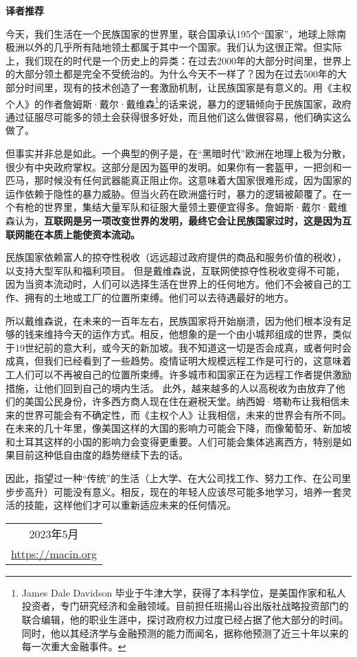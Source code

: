 \begin{center}
    \Huge\textbf{译者推荐}
\end{center}

今天，我们生活在一个民族国家的世界里，联合国承认195个“国家”，地球上除南极洲以外的几乎所有陆地领土都属于其中一个国家。我们认为这很正常。但实际上，我们现在的时代是一个历史上的异类：在过去2000年的大部分时间里，世界上的大部分领土都是完全不受统治的。为什么今天不一样了？因为在过去500年的大部分时间里，现有的技术创造了一套激励机制，让民族国家是有意义的。用《主权个人》的作者詹姆斯·戴尔·戴维森\footnote{James Dale Davidson 毕业于牛津大学，获得了本科学位，是美国作家和私人投资者，专门研究经济和金融领域。目前担任班揚山谷出版社战略投资部门的联合编辑，他的职业生涯中，探讨政府权力过度已经占据了他大部分的时间。同时，他以其经济学与金融预测的能力而闻名，据称他预测了近三十年以来的每一次重大金融事件。}的话来说，暴力的逻辑倾向于民族国家，政府通过征服尽可能多的领土会获得很多好处，而且他们这么做很容易，他们确实这么做了。

但事实并非总是如此。一个典型的例子是，在“黑暗时代”欧洲在地理上极为分散，很少有中央政府掌权。这部分是因为盔甲的发明。如果你有一套盔甲，一把剑和一匹马，那时候没有任何武器能真正阻止你。这意味着大国家很难形成，因为国家的运作依赖于隐性的暴力威胁。但当火药在欧洲盛行时，暴力的逻辑被颠覆了。在一个有枪的世界里，集结大量军队和征服大量领土要便宜得多。詹姆斯·戴尔·戴维森认为，\textbf{互联网是另一项改变世界的发明，最终它会让民族国家过时，这是因为互联网能在本质上能使资本流动。}

民族国家依赖富人的掠夺性税收（远远超过政府提供的商品和服务价值的税收），以支持大型军队和福利项目。 但是戴维森说，互联网使掠夺性税收变得不可能，因为当资本流动时，人们可以选择生活在世界上的任何地方。他们不会被自己的工作、拥有的土地或工厂的位置所束缚。他们可以去待遇最好的地方。

所以戴维森说，在未来的一百年左右，民族国家将开始崩溃，因为他们根本没有足够的钱来维持今天的运作方式。相反，他想象的是一个由小城邦组成的世界，类似于19世纪前的意大利，或今天的新加坡。我不知道这一切是否会成真，或者何时会成真，但我们已经看到了一些趋势。疫情证明大规模远程工作是可行的，这意味着工人们可以不再被自己的位置所束缚。许多城市和国家正在为远程工作者提供激励措施，让他们回到自己的境内生活。 此外，越来越多的人以高税收为由放弃了他们的美国公民身份，许多西方商人现在住在避税天堂。纳西姆·塔勒布让我相信未来的世界可能会有不确定性，而《主权个人》让我相信，未来的世界会有所不同。在未来的几十年里，像美国这样的大国的影响力可能会下降，而像葡萄牙、新加坡和土耳其这样的小国的影响力会变得更重要。人们可能会集体逃离西方，特别是如果目前这种低自由度的趋势继续下去的话。

因此，指望过一种“传统”的生活（上大学、在大公司找工作、努力工作、在公司里步步高升）可能没有意义。相反，现在的年轻人应该尽可能多地学习，培养一套灵活的技能，这样他们才可以重新适应未来的任何情况。

\vspace{1em}

\begin{flushright}
    \begin{tabular}{c}
        2023年5月\\
        \url{https://macin.org}
    \end{tabular}
\end{flushright}
